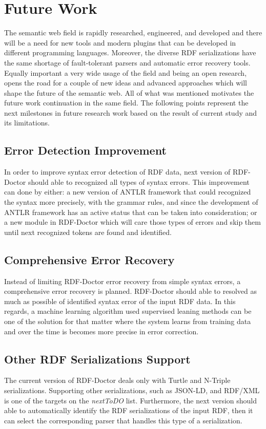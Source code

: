 \section{Future Work}

The semantic web field is rapidly researched, engineered, and developed and there will be a need for new tools and modern plugins that can be developed in different programming languages. Moreover, the diverse RDF serializations have the same shortage of fault-tolerant parsers and automatic error recovery tools. 
Equally important a very wide usage of the field and being an open research, opens the road for a couple of new ideas and advanced approaches which will shape the future of the semantic web. All of what was mentioned motivates the future work continuation in the same field. The following points represent the next milestones in future research work based on the result of current study and its limitations.   

\subsection{Error Detection Improvement}
In order to improve syntax error detection of RDF data, next version of RDF-Doctor should able to recognized all types of syntax errors. This improvement can done by either: a new version of ANTLR framework that could recognized the syntax more precisely, with the grammar rules, and since the development of ANTLR framework has an active status that can be taken into consideration; or a new module in RDF-Doctor which will care those types of errors and skip them until  next recognized tokens are found and identified.  
\subsection{Comprehensive Error Recovery}
Instead of limiting RDF-Doctor error recovery from simple syntax errors, a comprehensive error recovery is planned. RDF-Doctor should able to resolved as much as possible of identified syntax error of the input RDF data. In this regards, a machine learning algorithm used supervised leaning methods can be one of the solution for that matter where the system learns from training data and over the time is becomes more precise in error correction.   

\subsection{ Other RDF Serializations Support}
The current version of RDF-Doctor deals  only with Turtle and N-Triple serializations. Supporting other serializations, such as JSON-LD, and RDF/XML is one of the targets on the \emph{nextToDO} list. Furthermore, the next version should able to automatically identify the RDF serializations of the input RDF, then it can select the corresponding parser that handles this type of a serialization.     
